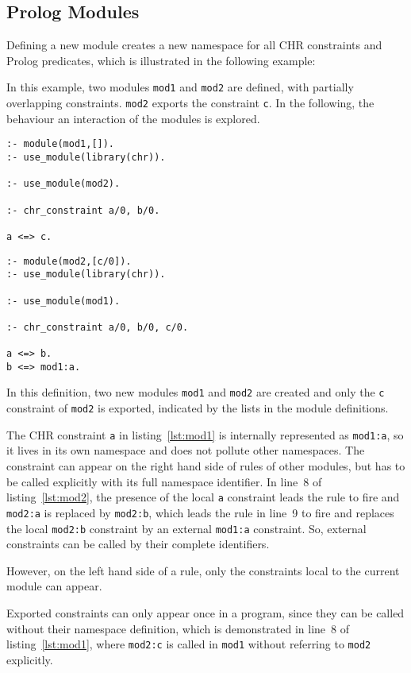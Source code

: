 \subsection{Prolog Modules}

Defining a new module creates a new namespace for all CHR constraints and Prolog predicates, which is illustrated in the following example:

\begin{example}

In this example, two modules \verb|mod1| and \verb|mod2| are defined, with partially overlapping constraints. \verb|mod2| exports the constraint \verb|c|. In the following, the behaviour an interaction of the modules is explored.

\begin{lstlisting}[caption={Definition of Module 1},label=lst:mod1]
:- module(mod1,[]).
:- use_module(library(chr)).

:- use_module(mod2).

:- chr_constraint a/0, b/0.

a <=> c.
\end{lstlisting}

\begin{lstlisting}[caption={Definition of Module 2},label=lst:mod2]
:- module(mod2,[c/0]).
:- use_module(library(chr)).

:- use_module(mod1).

:- chr_constraint a/0, b/0, c/0. 

a <=> b.
b <=> mod1:a.
\end{lstlisting}


In this definition, two new modules \verb|mod1| and \verb|mod2| are created and only the \verb|c| constraint of \verb|mod2| is exported, indicated by the lists in the module definitions.

The CHR constraint \verb|a| in listing~\ref{lst:mod1} is internally represented as \verb|mod1:a|, so it lives in its own namespace and does not pollute other namespaces. The constraint can appear on the right hand side of rules of other modules, but has to be called explicitly with its full namespace identifier. In line~8 of listing~\ref{lst:mod2}, the presence of the local \verb|a| constraint leads the rule to fire and \verb|mod2:a| is replaced by \verb|mod2:b|, which leads the rule in line~9 to fire and replaces the local \verb|mod2:b| constraint by an external \verb|mod1:a| constraint. So, external constraints can be called by their complete identifiers.

However, on the left hand side of a rule, only the constraints local to the current module can appear. 

Exported constraints can only appear once in a program, since they can be called without their namespace definition, which is demonstrated in line~8 of listing~\ref{lst:mod1}, where \verb|mod2:c| is called in \verb|mod1| without referring to \verb|mod2| explicitly.
\end{example}

